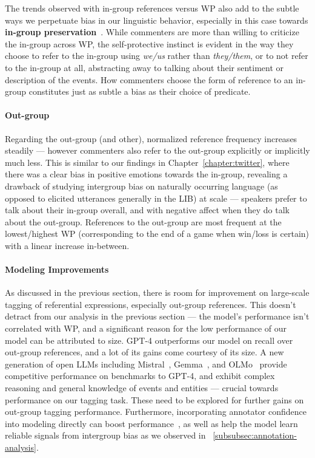 The trends observed with in-group references versus WP also add to the subtle ways we perpetuate bias in our linguistic behavior, especially in this case towards \textbf{in-group preservation}~\citep{maass_linguistic_1999}. While commenters are more than willing to criticize the in-group across WP, the self-protective instinct is evident in the way they choose to refer to the in-group using \emph{we/us} rather than \emph{they/them}, or to not refer to the in-group at all, abstracting away to talking about their sentiment or description of the events. How commenters choose the form of reference to an in-group constitutes just as subtle a bias as their choice of predicate.

\paragraph{Out-group} Regarding the out-group (and other), normalized reference frequency increases steadily --- however commenters also refer to the out-group explicitly or implicitly much less. This is similar to our findings in Chapter~\ref{chapter:twitter}, where there was a clear bias in positive emotions towards the in-group, revealing a drawback of studying intergroup bias on naturally occurring language (as opposed to elicited utterances generally in the LIB) at scale --- speakers prefer to talk about their in-group overall, and with negative affect when they do talk about the out-group. References to the out-group are most frequent at the lowest/highest WP (corresponding to the end of a game when win/loss is certain) with a linear increase in-between. 

\paragraph{Modeling Improvements} As discussed in the previous section, there is room for improvement on large-scale tagging of referential expressions, especially out-group references. This doesn't detract from our analysis in the previous section --- the model's performance isn't correlated with WP, and a significant reason for the low performance of our model can be attributed to size. GPT-4 outperforms our model on recall over out-group references, and a lot of its gains come courtesy of its size. A new generation of open LLMs including Mistral~\citep{jiang2023mistral}, Gemma~\cite{geminiteam2023gemini}, and OLMo~\citep{Groeneveld2023OLMo} provide competitive performance on benchmarks to GPT-4, and exhibit complex reasoning and general knowledge of events and entities --- crucial towards performance on our tagging task. These need to be explored for further gains on out-group tagging performance. Furthermore, incorporating annotator confidence into modeling directly can boost performance~\citep{atwell-etal-2022-role}, as well as help the model learn reliable signals from intergroup bias as we observed in \textsection~\ref{subsubsec:annotation-analysis}.
